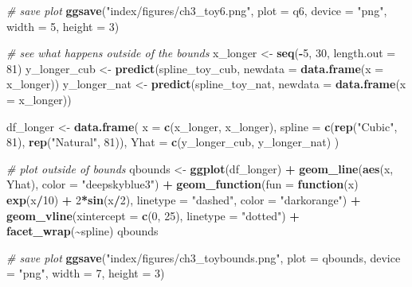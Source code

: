 \documentclass[12pt, twoside]{amherstthesis}
\newenvironment{Shaded}{\begin{snugshade}}{\end{snugshade}}
\newcommand{\AttributeTok}[1]{\textcolor[rgb]{0.13,0.29,0.53}{#1}}
\newcommand{\CommentTok}[1]{\textcolor[rgb]{0.56,0.35,0.01}{\textit{#1}}}
\newcommand{\ControlFlowTok}[1]{\textcolor[rgb]{0.13,0.29,0.53}{\textbf{#1}}}
\newcommand{\DecValTok}[1]{\textcolor[rgb]{0.00,0.00,0.81}{#1}}
\newcommand{\FunctionTok}[1]{\textcolor[rgb]{0.13,0.29,0.53}{\textbf{#1}}}
\newcommand{\NormalTok}[1]{#1}
\newcommand{\OtherTok}[1]{\textcolor[rgb]{0.56,0.35,0.01}{#1}}
\newcommand{\SpecialCharTok}[1]{\textcolor[rgb]{0.81,0.36,0.00}{\textbf{#1}}}
\newcommand{\StringTok}[1]{\textcolor[rgb]{0.31,0.60,0.02}{#1}}
\begin{document}
\begin{Shaded}
\begin{Highlighting}[]
\CommentTok{\# save plot}
\FunctionTok{ggsave}\NormalTok{(}\StringTok{"index/figures/ch3\_toy6.png"}\NormalTok{, }\AttributeTok{plot =}\NormalTok{ q6, }\AttributeTok{device =} \StringTok{"png"}\NormalTok{, }
       \AttributeTok{width =} \DecValTok{5}\NormalTok{, }\AttributeTok{height =} \DecValTok{3}\NormalTok{)}

\CommentTok{\# see what happens outside of the bounds}
\NormalTok{x\_longer }\OtherTok{\textless{}{-}} \FunctionTok{seq}\NormalTok{(}\SpecialCharTok{{-}}\DecValTok{5}\NormalTok{, }\DecValTok{30}\NormalTok{, }\AttributeTok{length.out =} \DecValTok{81}\NormalTok{)}
\NormalTok{y\_longer\_cub }\OtherTok{\textless{}{-}} \FunctionTok{predict}\NormalTok{(spline\_toy\_cub, }
                        \AttributeTok{newdata =} \FunctionTok{data.frame}\NormalTok{(}\AttributeTok{x =}\NormalTok{ x\_longer))}
\NormalTok{y\_longer\_nat }\OtherTok{\textless{}{-}} \FunctionTok{predict}\NormalTok{(spline\_toy\_nat, }
                        \AttributeTok{newdata =} \FunctionTok{data.frame}\NormalTok{(}\AttributeTok{x =}\NormalTok{ x\_longer))}

\NormalTok{df\_longer }\OtherTok{\textless{}{-}} \FunctionTok{data.frame}\NormalTok{(}
  \AttributeTok{x =} \FunctionTok{c}\NormalTok{(x\_longer, x\_longer), }
  \AttributeTok{spline =} \FunctionTok{c}\NormalTok{(}\FunctionTok{rep}\NormalTok{(}\StringTok{"Cubic"}\NormalTok{, }\DecValTok{81}\NormalTok{), }\FunctionTok{rep}\NormalTok{(}\StringTok{"Natural"}\NormalTok{, }\DecValTok{81}\NormalTok{)), }
  \AttributeTok{Yhat =} \FunctionTok{c}\NormalTok{(y\_longer\_cub, y\_longer\_nat)}
\NormalTok{)}

\CommentTok{\# plot outside of bounds}
\NormalTok{qbounds }\OtherTok{\textless{}{-}} \FunctionTok{ggplot}\NormalTok{(df\_longer) }\SpecialCharTok{+} 
  \FunctionTok{geom\_line}\NormalTok{(}\FunctionTok{aes}\NormalTok{(x, Yhat), }\AttributeTok{color =} \StringTok{"deepskyblue3"}\NormalTok{) }\SpecialCharTok{+}
  \FunctionTok{geom\_function}\NormalTok{(}\AttributeTok{fun =} \ControlFlowTok{function}\NormalTok{(x) }\FunctionTok{exp}\NormalTok{(x}\SpecialCharTok{/}\DecValTok{10}\NormalTok{) }\SpecialCharTok{+} \DecValTok{2}\SpecialCharTok{*}\FunctionTok{sin}\NormalTok{(x}\SpecialCharTok{/}\DecValTok{2}\NormalTok{), }
                \AttributeTok{linetype =} \StringTok{"dashed"}\NormalTok{, }\AttributeTok{color =} \StringTok{"darkorange"}\NormalTok{) }\SpecialCharTok{+}
  \FunctionTok{geom\_vline}\NormalTok{(}\AttributeTok{xintercept =} \FunctionTok{c}\NormalTok{(}\DecValTok{0}\NormalTok{, }\DecValTok{25}\NormalTok{), }\AttributeTok{linetype =} \StringTok{"dotted"}\NormalTok{) }\SpecialCharTok{+}
  \FunctionTok{facet\_wrap}\NormalTok{(}\SpecialCharTok{\textasciitilde{}}\NormalTok{spline) }
\NormalTok{qbounds}

\CommentTok{\# save plot}
\FunctionTok{ggsave}\NormalTok{(}\StringTok{"index/figures/ch3\_toybounds.png"}\NormalTok{, }\AttributeTok{plot =}\NormalTok{ qbounds, }
       \AttributeTok{device =} \StringTok{"png"}\NormalTok{, }\AttributeTok{width =} \DecValTok{7}\NormalTok{, }\AttributeTok{height =} \DecValTok{3}\NormalTok{)}
\end{Highlighting}
\end{Shaded}
\normalsize
\end{document}
